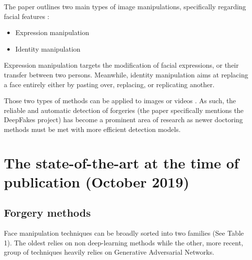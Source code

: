 \documentclass{article} %
\begin{document}
The paper outlines two main types of image manipulations, specifically regarding facial features \citep{DBLP:journals/corr/abs-1803-09179}:
\begin{itemize}
    \item Expression manipulation
    \item Identity manipulation
\end{itemize}
Expression manipulation targets the modification of facial expressions, or their transfer between two persons. Meanwhile, identity manipulation aims at replacing a face entirely either by pasting over, replacing, or replicating another. 

Those two types of methods can be applied to images or videos \citep{DBLP:journals/corr/KorshunovaSDT16}. As such, the reliable and automatic detection of forgeries (the paper specifically mentions the DeepFakes  project\citep{faceswap}) has become a prominent area of research as newer doctoring methods must be met with more efficient detection models.

\section{The state-of-the-art at the time of publication (October 2019)}

\subsection{Forgery methods}

Face manipulation techniques can be broadly sorted into two families (See Table 1). The oldest relies on non deep-learning methods while the other, more recent, group of techniques heavily relies on Generative Adversarial Networks.
\end{document}
